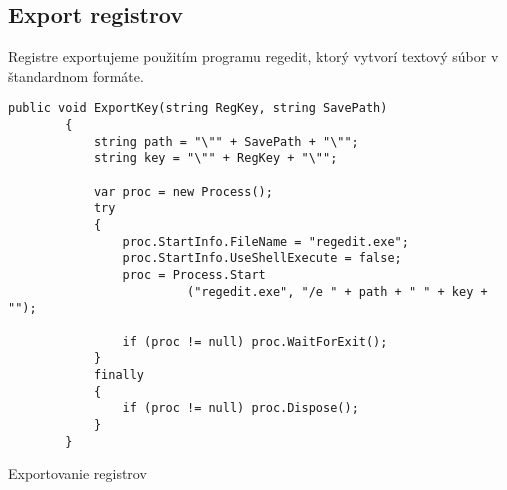 \subsection{Export registrov}
Registre exportujeme použitím programu regedit, ktorý vytvorí textový súbor v štandardnom formáte.
\begin{listing}
\begin{verbatim}
public void ExportKey(string RegKey, string SavePath)
        {
            string path = "\"" + SavePath + "\"";
            string key = "\"" + RegKey + "\"";

            var proc = new Process();
            try
            {
                proc.StartInfo.FileName = "regedit.exe";
                proc.StartInfo.UseShellExecute = false;
                proc = Process.Start
                         ("regedit.exe", "/e " + path + " " + key + "");

                if (proc != null) proc.WaitForExit();
            }
            finally
            {
                if (proc != null) proc.Dispose();
            }
        }  
\end{verbatim}
\caption{Exportovanie registrov}
\label{lst:regexport}
\end{listing}


